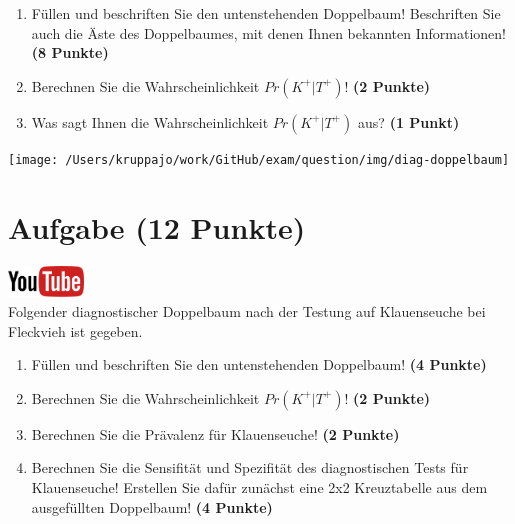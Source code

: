 \documentclass[a4paper, 9pt]{scrartcl}\usepackage[]{graphicx}\usepackage[]{xcolor}
\begin{document}
\begin{enumerate}
\item F{\"u}llen und beschriften Sie den untenstehenden Doppelbaum! Beschriften
  Sie auch die {\"A}ste des Doppelbaumes, mit denen Ihnen bekannten
  Informationen!  \textbf{(8 Punkte)}
\item Berechnen Sie die Wahrscheinlichkeit $Pr(K^+|T^+)$! \textbf{(2 Punkte)}
\item Was sagt Ihnen die Wahrscheinlichkeit $Pr(K^+|T^+)$ aus? \textbf{(1 Punkt)}
\end{enumerate}

\vspace{1cm}

\begin{center}
  \texttt{[image: /Users/kruppajo/work/GitHub/exam/question/img/diag-doppelbaum]}
\end{center}



 
\clearpage

\section{Aufgabe \hfill (12 Punkte)}


\hfill\href{https://youtu.be/_7s44pbOc00}{\includegraphics[width =
  2cm]{img/youtube}}\\[1Ex]





Folgender diagnostischer Doppelbaum nach der Testung auf Klauenseuche bei
Fleckvieh ist gegeben.

\begin{enumerate}
\item F{\"u}llen und beschriften Sie den untenstehenden Doppelbaum! \textbf{(4
    Punkte)}
\item Berechnen Sie die Wahrscheinlichkeit $Pr(K^+|T^+)$! \textbf{(2 Punkte)}
\item Berechnen Sie die Pr{\"a}valenz f{\"u}r Klauenseuche! \textbf{(2 Punkte)}
\item Berechnen Sie die Sensifit{\"a}t und Spezifit{\"a}t des diagnostischen Tests
  f{\"u}r Klauenseuche! Erstellen Sie daf{\"u}r zun{\"a}chst eine 2x2 Kreuztabelle aus
  dem ausgef{\"u}llten Doppelbaum!
  \textbf{(4 Punkte)}
\end{enumerate}
\end{document}
